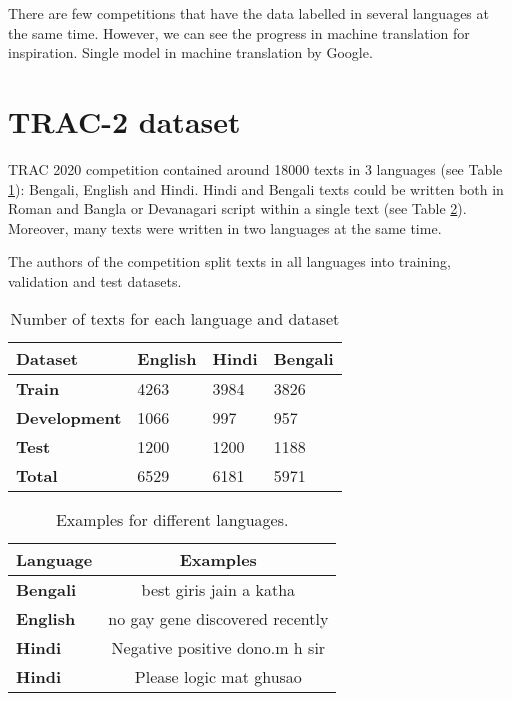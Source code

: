 \documentclass[10pt, a4paper]{article}
\begin{document}
There are few competitions that have the data labelled in several languages at the same time. However, we can see the progress in machine translation for inspiration. Single model in machine translation by Google.
\section{TRAC-2 dataset}
TRAC 2020 competition contained around 18000 texts in 3 languages (see Table \ref{tab:dataset}): Bengali, English and Hindi. Hindi and Bengali texts could be written both in Roman and Bangla or Devanagari script within a single text (see Table \ref{tab:examples}). Moreover, many texts were written in two languages at the same time.

The authors of the competition split texts in all languages into training, validation and test datasets.
\begin{table}[h]
	\begin{tabular}{|l|lll|}
		\hline
		\bf Dataset & \bf English & \bf Hindi & \bf Bengali\\ 
		\hline
		\hline
\bf Train & 	  4263 & 3984 & 3826\\  \hline
\bf Development & 1066 & 997  & 957\\  \hline
\bf Test & 		  1200 & 1200 & 1188\\ \hline\hline
\bf Total &       6529 & 6181 & 5971\\ \hline
	\end{tabular}
	\caption{Number of texts for each language and dataset}
	\label{tab:dataset}
\end{table}

\begin{table}[h]
	\begin{tabular}{|l|c|}
		\hline
		\bf Language & \bf Examples \\ \hline \hline
		\bf{Bengali} & best giris jain a katha \\ \hline
		\bf English & no gay gene discovered recently\\ \hline
		\bf Hindi & Negative positive {\dn dono.m} h sir \\ \hline
		\bf Hindi & Please logic mat ghusao \\ \hline
		
	\end{tabular}
	\caption{Examples for different languages.}
	\label{tab:examples}
\end{table}
\end{document}
